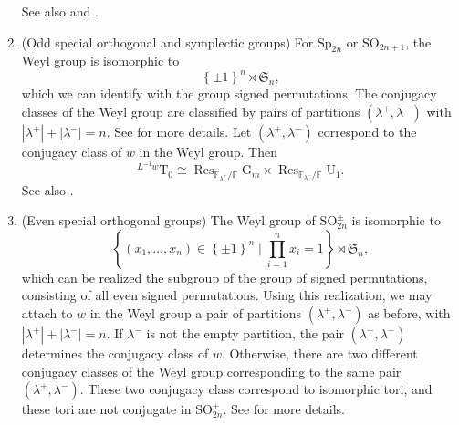 \documentclass[12pt, reqno]{amsart}
\theoremstyle{definition}
\theoremstyle{definition}
\theoremstyle{definition}
\newcommand{\lengthof}{\ell}
\newcommand{\sizeof}[1]{\left|#1\right|}
\newcommand{\involution}[1]{#1^{c}}
\newcommand{\diag}{\mathrm{diag}}
\newcommand{\SO}{\mathrm{SO}}
\newcommand{\Sp}{\mathrm{Sp}}
\newcommand{\UnitaryGroup}{\mathrm{U}}
\newcommand{\finiteField}{\mathbb{F}}
\newcommand{\finiteFieldExtension}[1]{\finiteField_{#1}}
\newcommand{\restrictionOfScalars}[3]{\operatorname{Res}_{#1 \slash #2}{#3}}
\newcommand{\multiplcativeScheme}{\algebraicGroup{G}_m}
\newcommand{\algebraicGroup}[1]{\boldsymbol{\mathrm{#1}}}
\newcommand{\SymmetricGroup}{\mathfrak{S}}
\begin{document}
\begin{enumerate}
	See also \cite[Section 2.3]{ThiemVinroot2009} and \cite[Section 2.2]{SaitoShinoda2000}.
    \item (Odd special orthogonal and symplectic groups)
    For $\algebraicGroup{\Sp}_{2n}$ or $\algebraicGroup{\SO}_{2n+1}$, the Weyl group is isomorphic to $$\left\{\pm 1\right\}^n \rtimes \SymmetricGroup_n,$$ which we can identify with the group signed permutations. The conjugacy classes of the Weyl group are classified by pairs of partitions $(\lambda^+,\lambda^-)$ with $\sizeof{\lambda^+} + \sizeof{\lambda^-} = n$. See \cite[Section 2.2]{KonvalinkaMatjavPfeiffer2011} for more details. Let $(\lambda^+,\lambda^-)$ correspond to the conjugacy class of $w$ in the Weyl group. Then
	$$^{L^{-1}w}\algebraicGroup{T}_0 \cong \restrictionOfScalars{\finiteFieldExtension{\lambda^{+}}}{\finiteField}{\multiplcativeScheme} \times \restrictionOfScalars{\finiteFieldExtension{\lambda^{-}}}{\finiteField}{\algebraicGroup{\UnitaryGroup}_1}.$$
		See also \cite[Section 3.2 Part (B)]{Zalesski2018}.
        \item (Even special orthogonal groups) The Weyl group of $\algebraicGroup{SO}_{2n}^{\pm}$ is isomorphic to $$\left\{ \left(x_1,\dots,x_n\right) \in \left\{\pm 1\right\}^n \mid \prod_{i=1}^n x_i = 1\right\} \rtimes \SymmetricGroup_n,$$ which can be realized the subgroup of the group of signed permutations, consisting of all even signed permutations. Using this realization, we may attach to $w$ in the Weyl group a pair of partitions $\left(\lambda^+, \lambda^-\right)$ as before, with $\sizeof{\lambda^+} + \sizeof{\lambda^-} = n$. If $\lambda^{-}$ is not the empty partition, the pair $\left(\lambda^+, \lambda^-\right)$ determines the conjugacy class of $w$. Otherwise, there are two different conjugacy classes of the Weyl group corresponding to the same pair $\left(\lambda^{+}, \lambda^{-}\right)$. These two conjugacy class correspond to isomorphic tori, and these tori are not conjugate in $\algebraicGroup{\SO}_{2n}^{\pm}$. See \cite[Section 2.3]{KonvalinkaMatjavPfeiffer2011} for more details.

\end{enumerate}
\end{document}

